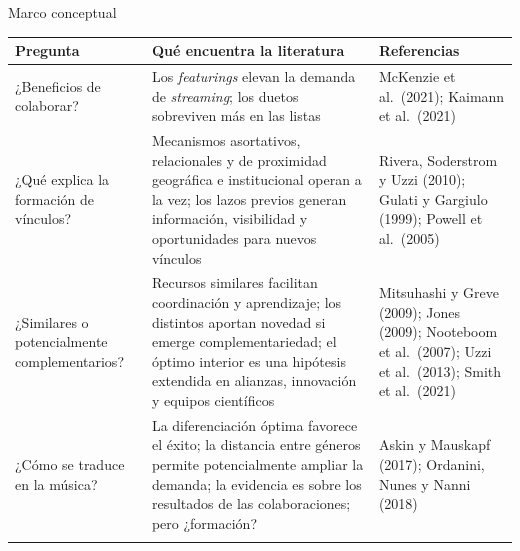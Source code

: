\documentclass[
  8pt,
  ignorenonframetext,
  aspectratio=169,
  spanish,
]{beamer}
\newcommand{\lightrowrule}{\arrayrulecolor{black!25}\specialrule{0.4pt}{1pt}{1pt}\arrayrulecolor{black}}
\begin{document}
\begin{frame}[shrink]{Marco conceptual}
\label{marco-conceptual}
~

\begin{longtable}[]{@{}
  >{\raggedright\arraybackslash}p{}
  >{\raggedright\arraybackslash}p{}
  >{\raggedright\arraybackslash}p{}@{}}
\toprule\noalign{}
\begin{minipage}[b]{\linewidth}\raggedright
Pregunta
\end{minipage} & \begin{minipage}[b]{\linewidth}\raggedright
Qué encuentra la literatura
\end{minipage} & \begin{minipage}[b]{\linewidth}\raggedright
Referencias
\end{minipage} \\
\midrule\noalign{}
\endhead
\bottomrule\noalign{}
\endlastfoot
¿Beneficios de colaborar? & Los \emph{featurings} elevan la demanda de
\emph{streaming}; los duetos sobreviven más en las listas & McKenzie et
al.~(2021); Kaimann et al.~(2021) \\ \lightrowrule
¿Qué explica la formación de vínculos? & Mecanismos asortativos,
relacionales y de proximidad geográfica e institucional operan a la vez;
los lazos previos generan información, visibilidad y oportunidades para
nuevos vínculos & Rivera, Soderstrom y Uzzi (2010); Gulati y Gargiulo
(1999); Powell et al.~(2005) \\ \lightrowrule
¿Similares o potencialmente complementarios? & Recursos similares
facilitan coordinación y aprendizaje; los distintos aportan novedad si
emerge complementariedad; el óptimo interior es una hipótesis extendida
en alianzas, innovación y equipos científicos & Mitsuhashi y Greve
(2009); Jones (2009); Nooteboom et al.~(2007); Uzzi et al.~(2013); Smith
et al.~(2021) \\ \lightrowrule
¿Cómo se traduce en la música? & La diferenciación óptima favorece el
éxito; la distancia entre géneros permite potencialmente ampliar la
demanda; la evidencia es sobre los resultados de las colaboraciones;
pero ¿formación? & Askin y Mauskapf (2017); Ordanini, Nunes y Nanni
(2018) \\ \lightrowrule
\end{longtable}

\end{frame}
\end{document}

